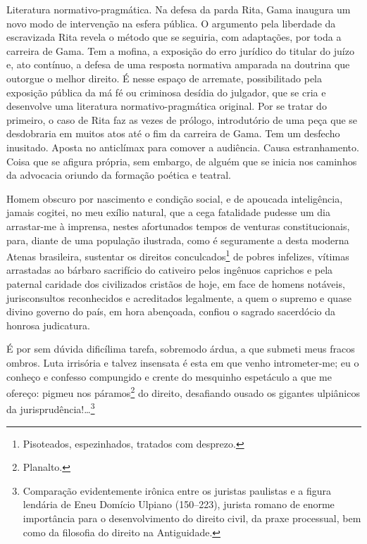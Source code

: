 \begin{didascalia}
Literatura normativo-pragmática. Na defesa da parda Rita, Gama inaugura
um novo modo de intervenção na esfera pública. O argumento pela
liberdade da escravizada Rita revela o método que se seguiria, com
adaptações, por toda a carreira de Gama. Tem a mofina, a exposição do
erro jurídico do titular do juízo e, ato contínuo, a defesa de uma
resposta normativa amparada na doutrina que outorgue o melhor direito. É
nesse espaço de arremate, possibilitado pela exposição pública da má fé
ou criminosa desídia do julgador, que se cria e desenvolve uma
literatura normativo-pragmática original. Por se tratar do primeiro, o
caso de Rita faz as vezes de prólogo, introdutório de uma peça que se
desdobraria em muitos atos até o fim da carreira de Gama. Tem um
desfecho inusitado. Aposta no anticlímax para comover a audiência. Causa
estranhamento. Coisa que se afigura própria, sem embargo, de alguém que
se inicia nos caminhos da advocacia oriundo da formação poética e
teatral.
\end{didascalia}



Homem obscuro por nascimento e condição social, e de apoucada
inteligência, jamais cogitei, no meu exílio natural, que a cega
fatalidade pudesse um dia arrastar-me à imprensa, nestes afortunados
tempos de venturas constitucionais, para, diante de uma população
ilustrada, como é seguramente a desta moderna Atenas brasileira,
sustentar os direitos conculcados\footnote{Pisoteados, espezinhados,
  tratados com desprezo.} de pobres infelizes, vítimas arrastadas ao
bárbaro sacrifício do cativeiro pelos ingênuos caprichos e pela paternal
caridade dos civilizados cristãos de hoje, em face de homens notáveis,
jurisconsultos reconhecidos e acreditados legalmente, a quem o supremo e
quase divino governo do país, em hora abençoada, confiou o sagrado
sacerdócio da honrosa judicatura.

É por sem dúvida dificílima tarefa, sobremodo árdua, a que submeti meus
fracos ombros. Luta irrisória e talvez insensata é esta em que venho
intrometer-me; eu o conheço e confesso compungido e crente do mesquinho
espetáculo a que me ofereço: pigmeu nos páramos\footnote{Planalto.} do
direito, desafiando ousado os gigantes ulpiânicos da
jurisprudência!\ldots{}\footnote{Comparação evidentemente irônica entre os
  juristas paulistas e a figura lendária de Eneu Domício Ulpiano
  (150--223), jurista romano de enorme importância para o desenvolvimento
  do direito civil, da praxe processual, bem como da filosofia do
  direito na Antiguidade.}

